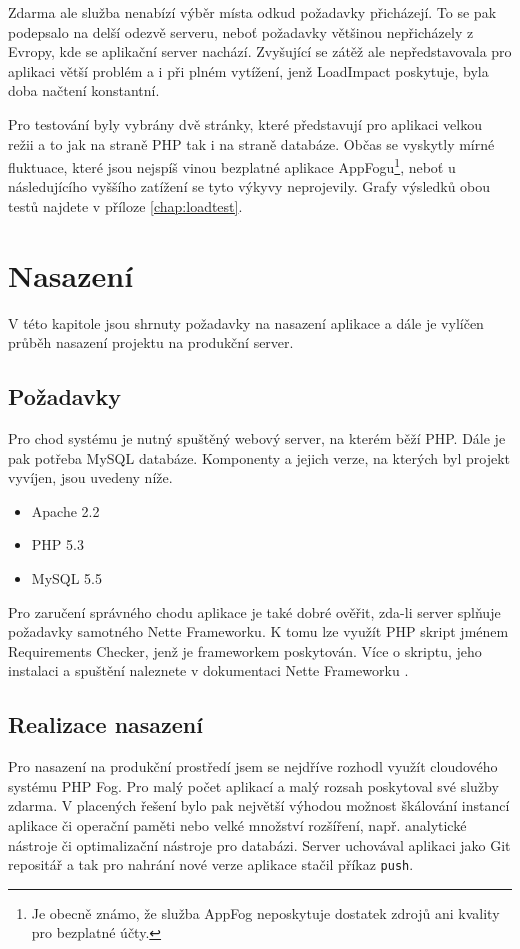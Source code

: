 \documentclass[11pt,twoside,a4paper]{book}
\begin{document}
Zdarma ale služba nenabízí výběr místa odkud požadavky přicházejí. To se pak podepsalo na delší odezvě serveru, neboť požadavky většinou nepřicházely z Evropy, kde se aplikační server nachází. Zvyšující se zátěž ale nepředstavovala pro aplikaci větší problém a i při plném vytížení, jenž LoadImpact poskytuje, byla doba načtení konstantní.

Pro testování byly vybrány dvě stránky, které představují pro aplikaci velkou režii a to jak na straně PHP tak i na straně databáze. Občas se vyskytly mírné fluktuace, které jsou nejspíš vinou bezplatné aplikace AppFogu\footnote{Je obecně známo, že služba AppFog neposkytuje dostatek zdrojů ani kvality pro bezplatné účty.}, neboť u následujícího vyššího zatížení se tyto výkyvy neprojevily. Grafy výsledků obou testů najdete v příloze \ref{chap:loadtest}.

\chapter{Nasazení}
V této kapitole jsou shrnuty požadavky na nasazení aplikace a dále je vylíčen průběh nasazení projektu na produkční server.

\section{Požadavky}
Pro chod systému je nutný spuštěný webový server, na kterém běží PHP. Dále je pak potřeba MySQL databáze. Komponenty a jejich verze, na kterých byl projekt vyvíjen, jsou uvedeny níže.

\begin{itemize}
	\item Apache 2.2
	\item PHP 5.3
	\item MySQL 5.5
\end{itemize}

Pro zaručení správného chodu aplikace je také dobré ověřit, zda-li server splňuje požadavky samotného Nette Frameworku. K tomu lze využít PHP skript jménem Requirements Checker, jenž je frameworkem poskytován. Více o skriptu, jeho instalaci a spuštění naleznete v dokumentaci Nette Frameworku \cite{checker}.

\section{Realizace nasazení}
Pro nasazení na produkční prostředí jsem se nejdříve rozhodl využít cloudového systému PHP Fog. Pro malý počet aplikací a malý rozsah poskytoval své služby zdarma. V placených řešení bylo pak největší výhodou možnost škálování instancí aplikace či operační paměti nebo velké množství rozšíření, např. analytické nástroje či optimalizační nástroje pro databázi. Server uchovával aplikaci jako Git repositář a tak pro nahrání nové verze aplikace stačil příkaz \verb|push|.
\end{document}
